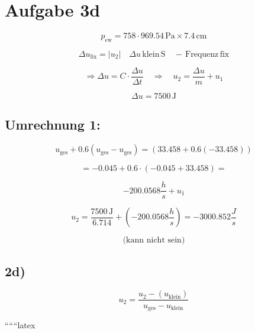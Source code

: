 \section*{Aufgabe 3d}

\[
p_{\text{ew}} = 758 \cdot 969.54 \, \text{Pa} \times 7.4 \, \text{cm}
\]

\[
\Delta u_{\text{fix}} = \left| u_{2} \right| \quad \Delta u \, \text{klein} \, \text{S} \quad - \, \text{Frequenz} \, \text{fix}
\]

\[
\Rightarrow \Delta u = C \cdot \frac{\Delta u}{\Delta t} \quad \Rightarrow \quad u_{2} = \frac{\Delta u}{m} + u_{1}
\]

\[
\Delta u = 7500 \, \text{J}
\]

\subsection*{Umrechnung 1:}

\[
u_{\text{ges}} + 0.6 \left( u_{\text{ges}} - u_{\text{ges}} \right) = \left( 33.458 + 0.6 \left( -33.458 \right) \right)
\]

\[
= -0.045 + 0.6 \cdot (-0.045 + 33.458) = 
\]

\[
-200.0568 \frac{h}{s} + u_{1}
\]

\[
u_{2} = \frac{7500 \, \text{J}}{6.714} + \left( -200.0568 \frac{h}{s} \right) = -3000.852 \frac{J}{s}
\]

\[
\text{(kann nicht sein)}
\]

\subsection*{2d)}

\[
u_{2} = \frac{u_{2} - (u_{\text{klein}})}{u_{\text{ges}} - u_{\text{klein}}}
\]

``````latex